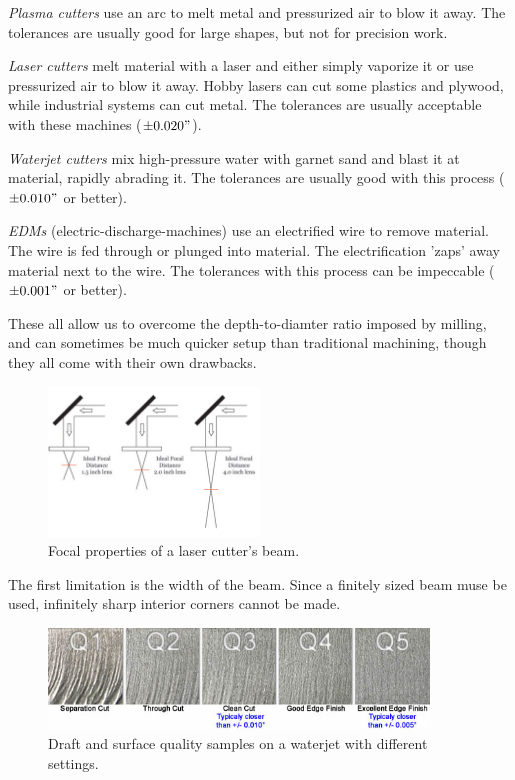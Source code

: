 \documentclass[10pt,letterpaper]{book}
\begin{document}
 \begin{asparaenum}[a)]
  	\item \textit{Plasma cutters} use an arc to melt metal and pressurized air to blow it away. The tolerances are usually good for large shapes, but not for precision work.
 	\item \textit{Laser cutters} melt material with a laser and either simply vaporize it or use pressurized air to blow it away. Hobby lasers can cut some plastics and plywood, while industrial systems can cut metal. The tolerances are usually acceptable with these machines ($\pm 0.020"$).
 	\item \textit{Waterjet cutters} mix high-pressure water with garnet sand and blast it at material, rapidly abrading it. The tolerances are usually good with this process ($\pm 0.010"$ or better).
 	\item \textit{EDMs} (electric-discharge-machines) use an electrified wire to remove material. The wire is fed through or plunged into material. The electrification 'zaps' away material next to the wire. The tolerances with this process can be impeccable ($\pm 0.001"$ or better). 
\end{asparaenum}
 	
 	These all allow us to overcome the depth-to-diamter ratio imposed by milling, and can sometimes be much quicker setup than traditional machining, though they all come with their own drawbacks.
 
 \begin{figure}[H] \centering
 	\includegraphics[width=0.5\textwidth]{imgs/lasercut_focus.jpeg}
 	\caption{Focal properties of a laser cutter's beam.}
 \end{figure}
 
  The first limitation is the width of the beam. Since a finitely sized beam muse be used, infinitely sharp interior corners cannot be made.
 
 \begin{figure}[H] \centering
 	\includegraphics[width=0.9\textwidth]{imgs/waterjet_draft.jpeg}
 	\caption{Draft and surface quality samples on a waterjet with different settings.}
 \end{figure}
 
\end{document}
